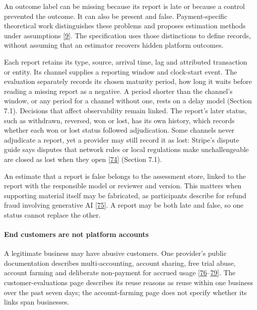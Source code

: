 \documentclass[
  11pt,
]{article}
\begin{document}
An outcome label can be missing because its report is late or because a
control prevented the outcome. It can also be present and false.
Payment-specific theoretical work distinguishes these problems and
proposes estimation methods under assumptions
{[}\protect\hyperlink{ref-Dhama2026Causal}{9}{]}. The specification uses
those distinctions to define records, without assuming that an estimator
recovers hidden platform outcomes.

Each report retains its type, source, arrival time, lag and attributed
transaction or entity. Its channel supplies a reporting window and
clock-start event. The evaluation separately records its chosen maturity
period, how long it waits before reading a missing report as a negative.
A period shorter than the channel's window, or any period for a channel
without one, rests on a delay model (Section 7.1). Decisions that affect
observability remain linked. The report's later status, such as
withdrawn, reversed, won or lost, has its own history, which records
whether each won or lost status followed adjudication. Some channels
never adjudicate a report, yet a provider may still record it as lost:
Stripe's dispute guide says disputes that network rules or local
regulations make unchallengeable are closed as lost when they open
{[}\protect\hyperlink{ref-Stripe2026Disputes}{74}{]} (Section 7.1).

An estimate that a report is false belongs to the assessment store,
linked to the report with the responsible model or reviewer and version.
This matters when supporting material itself may be fabricated, as
participants describe for refund fraud involving generative AI
{[}\protect\hyperlink{ref-Zhang2026Refund}{75}{]}. A report may be both
late and false, so one status cannot replace the other.

\hypertarget{end-customers-are-not-platform-accounts}{%
\paragraph{End customers are not platform
accounts}\label{end-customers-are-not-platform-accounts}}

A legitimate business may have abusive customers. One provider's public
documentation describes multi-accounting, account sharing, free trial
abuse, account farming and deliberate non-payment for accrued usage
{[}\protect\hyperlink{ref-Stripe2026CAE}{76}--\protect\hyperlink{ref-Stripe2026Farming}{79}{]}.
The customer-evaluations page describes its reuse reasons as reuse
within one business over the past seven days; the account-farming page
does not specify whether its links span businesses.
\end{document}
